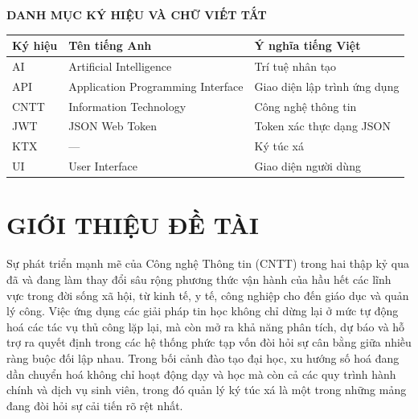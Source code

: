 \documentclass[a4paper,12pt,openany,oneside]{report}
\begin{document}
\clearpage
\tableofcontents

\clearpage
\begin{center}
    {\bfseries\fontsize{18pt}{22pt}\selectfont
        DANH MỤC KÝ HIỆU VÀ CHỮ VIẾT TẮT}
\end{center}
\vspace{1cm}

\begin{longtable}{p{3cm} p{5cm} p{6cm}}
    \toprule
    \textbf{Ký hiệu} & \textbf{Tên tiếng Anh} & \textbf{Ý nghĩa tiếng Việt} \\
    \midrule
    \endhead
    AI   & Artificial Intelligence           & Trí tuệ nhân tạo \\[3pt]
    API  & Application Programming Interface & Giao diện lập trình ứng dụng \\[3pt]
    CNTT & Information Technology            & Công nghệ thông tin \\[3pt]
    JWT  & JSON Web Token                    & Token xác thực dạng JSON \\[3pt]
    KTX  & ---                               & Ký túc xá \\[3pt]
    UI   & User Interface                    & Giao diện người dùng \\
    \bottomrule
\end{longtable}

\clearpage
\renewcommand{\listfigurename}{%
    \bfseries\fontsize{18pt}{22pt}\selectfont DANH MỤC HÌNH VẼ%
}
\listoffigures

\clearpage
\renewcommand{\listtablename}{%
    \bfseries\fontsize{18pt}{22pt}\selectfont DANH MỤC BẢNG%
}
\listoftables

\clearpage
\chapter{GIỚI THIỆU ĐỀ TÀI}

Sự phát triển mạnh mẽ của Công nghệ Thông tin (CNTT) trong hai thập kỷ qua đã
và đang làm thay đổi sâu rộng phương thức vận hành của hầu hết các lĩnh vực
trong đời sống xã hội, từ kinh tế, y tế, công nghiệp cho đến giáo dục và quản
lý công. Việc ứng dụng các giải pháp tin học không chỉ dừng lại ở mức tự động
hoá các tác vụ thủ công lặp lại, mà còn mở ra khả năng phân tích, dự báo và hỗ
trợ ra quyết định trong các hệ thống phức tạp vốn đòi hỏi sự cân bằng giữa
nhiều ràng buộc đối lập nhau. Trong bối cảnh đào tạo đại học, xu hướng số hoá
đang dần chuyển hoá không chỉ hoạt động dạy và học mà còn cả các quy trình hành
chính và dịch vụ sinh viên, trong đó quản lý ký túc xá là một trong những mảng
đang đòi hỏi sự cải tiến rõ rệt nhất.
\end{document}
